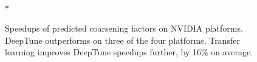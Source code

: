 \begin{figure}
	\centering %
	\\*
	\caption[Speedups of predicted thread coarsening factors on NVIDIA]{%
		Speedups of predicted coarsening factors on NVIDIA platforms. DeepTune outperforms \citeauthor{Magni2014} on three of the four platforms. Transfer learning improves DeepTune speedups further, by 16\% on average.%
	}%
	\label{fig:pact-speedup-right}
\end{figure}

